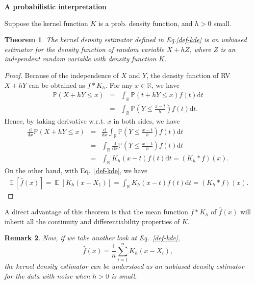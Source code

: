 \documentclass[19pt,landscape]{article}
\newtheorem{thm}{Theorem}%
\newtheorem{rem}[thm]{Remark}
\newcommand{\IP}{\mathbb{P}}
\DeclareMathOperator{\E}{\mathbb{E}}
\newcommand{\R}{\mathbb{R}}
\begin{document}
\newpage
{\LARGE\centerline{\textbf{A probabilistic interpretation}}}
\vskip25pt
\large
\noindent
Suppose the kernel function $K$ is a prob. density function, and $h>0$ small. 
 \vskip 5pt
 \begin{thm}
    The kernel density estimator defined in Eq.\eqref{def-kde} is an unbiased estimator for the density function of random variable $X+hZ$, where $Z$ is an independent random variable with density function $K$.
 \end{thm}
 \begin{proof}
    Because of the independence of $X$ and $Y$, the density function of RV $X+hY$ can be obtained as $f*K_h$.  
    For any $x\in\R$, we have
    \begin{eqnarray}
        \IP(X+hY\le x)&=&\int_{\R}\IP(t+hY\le x)f(t)\mathrm{d}t\nonumber\\
        &=&\int_{\R}\IP\left(Y\le \frac{x-t}h\right)f(t)\mathrm{d}t.
    \end{eqnarray}
    Hence, by taking derivative w.r.t. $x$ in both sides, we have
    \begin{eqnarray*}
        \frac{\mathrm{d}}{\mathrm{d}x}\IP(X+hY\le x)&=&\frac{\mathrm{d}}{\mathrm{d}x}\int_{\R}\IP\left(Y\le \frac{x-t}h\right)f(t)\mathrm{d}t\\
        &=&\int_{\R}\frac{\mathrm{d}}{\mathrm{d}x}\IP\left(Y\le \frac{x-t}h\right)f(t)\mathrm{d}t\\
        &=&\int_{\R}K_h(x-t)f(t)\mathrm{d}t=\left(K_h*f\right)(x). 
    \end{eqnarray*}
    On the other hand, with Eq.~\eqref{def-kde}, we have 
    \begin{eqnarray}\label{mean-kde}
        \E\left[\hat{f}(x)\right]=\E\left[K_h(x-X_1)\right]=\int_{\R}K_h(x-t)f(t)\mathrm{d}t=\left(K_h*f\right)(x).
    \end{eqnarray}
 \end{proof}
 \noindent
 A direct advantage of this theorem is that the mean function $f*K_h$ of $\hat{f}(x)$ will inherit all the continuity and differentiability properties of $K$.
\begin{rem}
Now, if we take another look at Eq.~\eqref{def-kde}, 
\begin{equation*}
    \hat{f}(x)=\frac1n\sum_{i=1}^nK_h(x-X_i), 
\end{equation*}
the kernel density estimator can be understood as an unbiased density estimator for the data with noise when $h>0$ is small.
\end{rem}
\end{document}
